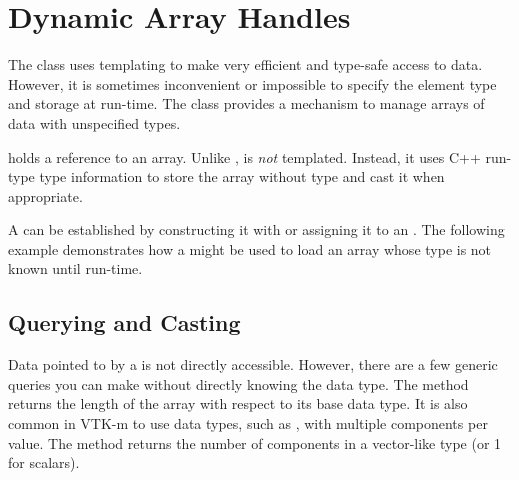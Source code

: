 
\chapter{Dynamic Array Handles}
\label{chap:DynamicArrayHandle}


The  class uses templating to make very
efficient and type-safe access to data. However, it is sometimes
inconvenient or impossible to specify the element type and storage at
run-time. The  class provides a mechanism
to manage arrays of data with unspecified types.

 holds a reference to an array. Unlike
,  is
\emph{not} templated. Instead, it uses C++ run-type type information to
store the array without type and cast it when appropriate.

A  can be established by constructing it
with or assigning it to an . The following
example demonstrates how a  might be
used to load an array whose type is not known until run-time.


\section{Querying and Casting}
\label{sec:DynamicArrayHandleQueryingAndCasting}

Data pointed to by a  is not directly
accessible. However, there are a few generic queries you can make without
directly knowing the data type. The  method
returns the length of the array with respect to its base data type. It is
also common in VTK-m to use data types, such as , with multiple
components per value. The  method returns
the number of components in a vector-like type (or 1 for scalars).


